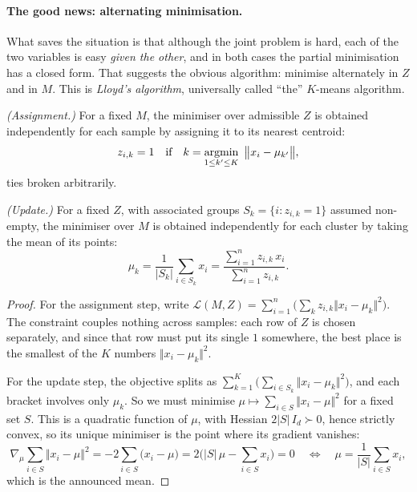 \paragraph{The good news: alternating minimisation.}
What saves the situation is that although the joint problem is hard, each of the two
variables is easy \emph{given the other}, and in both cases the partial minimisation has
a closed form. That suggests the obvious algorithm: minimise alternately in $Z$ and in
$M$. This is \emph{Lloyd's algorithm}, universally called ``the'' $K$-means algorithm.

\begin{lemma}
\label{lem:kmeans-steps}
\emph{(Assignment.)} For a fixed $M$, the minimiser over admissible $Z$ is obtained
independently for each sample by assigning it to its nearest centroid:
\[
z_{i,k} = 1 \quad \text{if} \quad k = \operatorname*{argmin}_{1 \leq k' \leq K} \ \big\Vert x_i - \mu_{k'} \big\Vert ,
\]
ties broken arbitrarily.

\emph{(Update.)} For a fixed $Z$, with associated groups $S_k = \{ i : z_{i,k} = 1\}$
assumed non-empty, the minimiser over $M$ is obtained independently for each cluster by
taking the mean of its points:
\[
\mu_k = \frac{1}{|S_k|} \sum_{i \in S_k} x_i
= \frac{\sum_{i=1}^n z_{i,k}\, x_i}{\sum_{i=1}^n z_{i,k}} .
\]
\end{lemma}

\begin{proof}
For the assignment step, write $\mathcal{L}(M, Z) = \sum_{i=1}^n \big( \sum_k z_{i,k}
\Vert x_i - \mu_k\Vert^2 \big)$. The constraint couples nothing across samples: each
row of $Z$ is chosen separately, and since that row must put its single $1$ somewhere,
the best place is the smallest of the $K$ numbers $\Vert x_i - \mu_k \Vert^2$.

For the update step, the objective splits as $\sum_{k=1}^K \big( \sum_{i \in S_k} \Vert
x_i - \mu_k \Vert^2 \big)$, and each bracket involves only $\mu_k$. So we must minimise
$\mu \mapsto \sum_{i \in S} \Vert x_i - \mu \Vert^2$ for a fixed set $S$. This is a
quadratic function of $\mu$, with Hessian $2 |S|\, I_d \succ 0$, hence strictly convex,
so its unique minimiser is the point where its gradient vanishes:
\[
\nabla_\mu \sum_{i \in S} \Vert x_i - \mu \Vert^2
= - 2 \sum_{i \in S} \big( x_i - \mu \big)
= 2 \Big( |S|\, \mu - \sum_{i \in S} x_i \Big) = 0
\quad \Longleftrightarrow \quad
\mu = \frac{1}{|S|} \sum_{i \in S} x_i ,
\]
which is the announced mean.
\end{proof}


